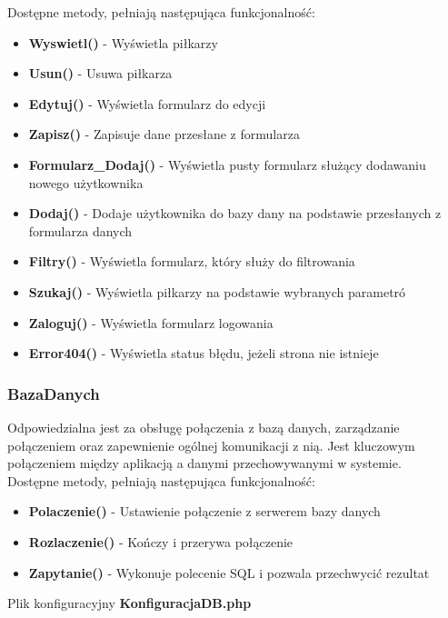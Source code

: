     Dostępne metody, pełniają następująca funkcjonalność: 
    \begin{itemize}
        \item \textbf{Wyswietl()} - Wyświetla piłkarzy
        \item \textbf{Usun()} - Usuwa piłkarza
        \item \textbf{Edytuj()} - Wyświetla formularz do edycji
        \item \textbf{Zapisz()} - Zapisuje dane przesłane z formularza
        \item \textbf{Formularz\_Dodaj()} - Wyświetla pusty formularz służący dodawaniu nowego użytkownika
        \item \textbf{Dodaj()} - Dodaje użytkownika do bazy dany na podstawie przesłanych z formularza danych
        \item \textbf{Filtry()} - Wyświetla formularz, który służy do filtrowania
        \item \textbf{Szukaj()} - Wyświetla piłkarzy na podstawie wybranych parametró
        \item \textbf{Zaloguj()} - Wyświetla formularz logowania
        \item \textbf{Error404()} - Wyświetla status błędu, jeżeli strona nie istnieje
    \end{itemize}
      


    \subsubsection{BazaDanych}
    Odpowiedzialna jest za obsługę połączenia z bazą danych, zarządzanie połączeniem  oraz zapewnienie ogólnej komunikacji z nią. Jest kluczowym połączeniem między aplikacją a danymi przechowywanymi w systemie.\\
    Dostępne metody, pełniają następująca funkcjonalność: 
    \begin{itemize}
        \item \textbf{Polaczenie()} - Ustawienie połączenie z serwerem bazy danych
        \item \textbf{Rozlaczenie()} - Kończy i przerywa połączenie
        \item \textbf{Zapytanie()} - Wykonuje polecenie SQL i pozwala przechwycić rezultat
    \end{itemize}
    Plik konfiguracyjny \textbf{KonfiguracjaDB.php}
     
     


